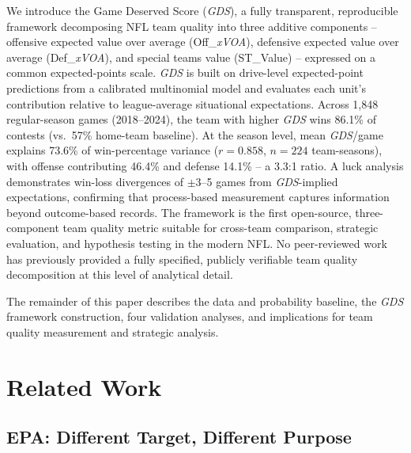 \documentclass[12pt,a4paper]{article}
\newcommand{\xscore}{\textit{xScore}}
\newcommand{\xvoa}{\textit{xVOA}}
\newcommand{\gds}{\textit{GDS}}
\begin{document}
We introduce the Game Deserved Score (\gds{}), a fully transparent, reproducible framework decomposing NFL team quality into three additive components -- offensive expected value over average (Off\_\xvoa{}), defensive expected value over average (Def\_\xvoa{}), and special teams value (ST\_Value) -- expressed on a common expected-points scale. \gds{} is built on drive-level expected-point predictions from a calibrated multinomial model \citep[\xscore{};][]{mecha2026xscore-model} and evaluates each unit's contribution relative to league-average situational expectations. Across 1,848 regular-season games (2018--2024), the team with higher \gds{} wins 86.1\% of contests (vs.\ 57\% home-team baseline). At the season level, mean \gds{}/game explains 73.6\% of win-percentage variance ($r = 0.858$, $n = 224$ team-seasons), with offense contributing 46.4\% and defense 14.1\% -- a 3.3:1 ratio. A luck analysis demonstrates win-loss divergences of $\pm$3--5 games from \gds{}-implied expectations, confirming that process-based measurement captures information beyond outcome-based records. The framework is the first open-source, three-component team quality metric suitable for cross-team comparison, strategic evaluation, and hypothesis testing in the modern NFL. No peer-reviewed work has previously provided a fully specified, publicly verifiable team quality decomposition at this level of analytical detail.

The remainder of this paper describes the data and probability baseline, the \gds{} framework construction, four validation analyses, and implications for team quality measurement and strategic analysis.

\section{Related Work}
\label{sec:related-work}

\subsection{EPA: Different Target, Different Purpose}
\end{document}
